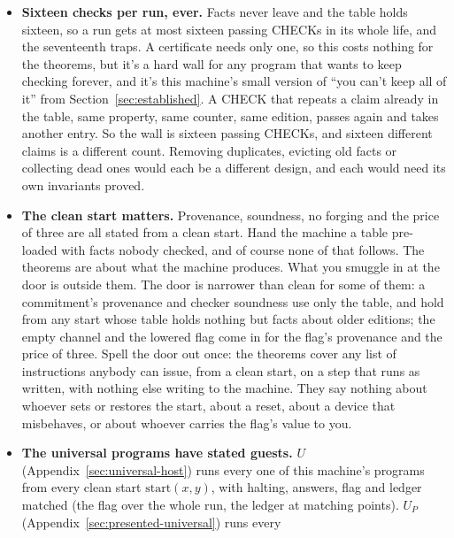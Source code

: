 \documentclass[11pt,twoside]{article}
\theoremstyle{thielethm}
\theoremstyle{thieledef}
\theoremstyle{thieledef}
\theoremstyle{thieledef}
\theoremstyle{thielethm}
\theoremstyle{thieleobs}
\theoremstyle{thielethm}
\begin{document}
\begin{itemize}
overwrite it; a receipt with a time on it would also need the step number kept; and several
certifications that each last would need a record richer than one flag. The publication file constructed earlier in this chapter keeps the set of
claims certified at least once. That extension shows exactly what the native
state left out. It still does not record which certification came first or
at what step; those questions would need their own retained answers.
\item \textbf{Sixteen checks per run, ever.} Facts never leave and the table holds sixteen, so a run
gets at most sixteen passing CHECKs in its whole life, and the seventeenth traps. A
certificate needs only one, so this costs nothing for the theorems, but it's a hard wall
for any program that wants to keep checking forever, and it's this machine's small version of
``you can't keep all of it'' from Section~\ref{sec:established}. A CHECK that repeats a claim already in the
table, same property, same counter, same edition, passes again and takes another entry. So the
wall is sixteen passing CHECKs, and sixteen different claims is a different count. Removing
duplicates, evicting old facts or collecting dead ones would each be a different design, and each
would need its own invariants proved.
\item \textbf{The clean start matters.} Provenance, soundness, no forging and the price of three are
all stated from a clean start. Hand the machine a table pre-loaded with facts nobody
checked, and of course none of that follows. The theorems are about what the machine
produces. What you smuggle in at the door is outside them. The door is narrower than clean for some of them: a commitment's provenance and checker soundness use only the table, and hold from any start whose table holds nothing but facts about older editions; the empty channel and the lowered flag come in for the flag's provenance and the price of three. Spell the door out once: the theorems
cover any list of instructions anybody can issue, from a clean start, on a step that runs as
written, with nothing else writing to the machine. They say nothing about whoever sets or
restores the start, about a reset, about a device that misbehaves, or about whoever carries the
flag's value to you.
\item \textbf{The universal programs have stated guests.} $U$ (Appendix~\ref{sec:universal-host}) runs every one of this machine's
programs from every clean start $\mathrm{start}(x, y)$, with halting, answers, flag and ledger matched (the flag over the whole run, the ledger at matching points). $U_P$ (Appendix~\ref{sec:presented-universal}) runs every

\end{itemize}
\end{document}
